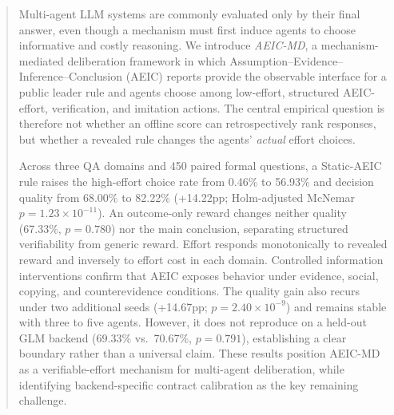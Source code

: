 \begin{abstract}
Multi-agent LLM systems are commonly evaluated only by their final answer, even though a mechanism must first induce agents to choose informative and costly reasoning.  We introduce \emph{AEIC-MD}, a mechanism-mediated deliberation framework in which Assumption--Evidence--Inference--Conclusion (AEIC) reports provide the observable interface for a public leader rule and agents choose among low-effort, structured AEIC-effort, verification, and imitation actions.  The central empirical question is therefore not whether an offline score can retrospectively rank responses, but whether a revealed rule changes the agents' \emph{actual} effort choices.

Across three QA domains and 450 paired formal questions, a Static-AEIC rule raises the high-effort choice rate from 0.46\% to 56.93\% and decision quality from 68.00\% to 82.22\% (+14.22pp; Holm-adjusted McNemar $p=1.23\times10^{-11}$).  An outcome-only reward changes neither quality (67.33\%, $p=0.780$) nor the main conclusion, separating structured verifiability from generic reward.  Effort responds monotonically to revealed reward and inversely to effort cost in each domain.  Controlled information interventions confirm that AEIC exposes behavior under evidence, social, copying, and counterevidence conditions.  The quality gain also recurs under two additional seeds (+14.67pp; $p=2.40\times10^{-9}$) and remains stable with three to five agents.  However, it does not reproduce on a held-out GLM backend (69.33\% vs.\ 70.67\%, $p=0.791$), establishing a clear boundary rather than a universal claim.  These results position AEIC-MD as a verifiable-effort mechanism for multi-agent deliberation, while identifying backend-specific contract calibration as the key remaining challenge.

\end{abstract}
